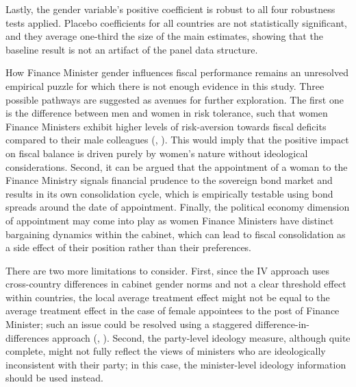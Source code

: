 \documentclass[12pt]{article}
\renewcommand{\citep}[1]{(\textit{\citeauthor{#1}}, \citeyear{#1})}
\begin{document}
Lastly, the gender variable’s positive coefficient is robust to all four robustness tests applied. Placebo coefficients for all countries are not statistically significant, and they average one-third the size of the main estimates, showing that the baseline result is not an artifact of the panel data structure.

How Finance Minister gender influences fiscal performance 
remains an unresolved empirical puzzle for which there is not enough evidence in 
this study. Three possible pathways are suggested as avenues for further 
exploration. The first one is the difference between men and women in risk 
tolerance, such that women Finance Ministers exhibit higher levels of 
risk-aversion towards fiscal deficits compared to their male colleagues 
\citep{croson2009}. This would imply that the positive impact on fiscal balance 
is driven purely by women’s nature without ideological considerations. Second, 
it can be argued that the appointment of a woman to the Finance Ministry 
signals financial prudence to the sovereign bond market and results in its own 
consolidation cycle, which is empirically testable using bond spreads around 
the date of appointment. Finally, the political economy dimension of 
appointment may come into play as women Finance Ministers have distinct 
bargaining dynamics within the cabinet, which can lead to fiscal consolidation 
as a side effect of their position rather than their preferences.

There are two more limitations to consider. First, since the IV approach uses 
cross-country differences in cabinet gender norms and not a clear threshold 
effect within countries, the local average treatment effect might not be equal 
to the average treatment effect in the case of female appointees to the post 
of Finance Minister; such an issue could be resolved using a staggered 
difference-in-differences approach \citep{callaway2021}. Second, the party-level 
ideology measure, although quite complete, might not fully reflect the views of 
ministers who are ideologically inconsistent with their party; in this case, 
the minister-level ideology information should be used instead.



\newpage
\singlespacing
\setlength{\bibsep}{6pt}
\end{document}
